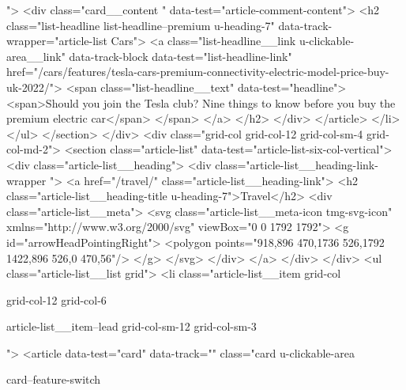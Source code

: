 {{{			
			
			 ">
<div class="card__content " data-test="article-comment-content">
<h2 class="list-headline list-headline--premium u-heading-7" data-track-wrapper="article-list Cars">
<a class="list-headline__link u-clickable-area__link" data-track-block data-test="list-headline-link" href="/cars/features/tesla-cars-premium-connectivity-electric-model-price-buy-uk-2022/">
<span class="list-headline__text" data-test="headline">
<span>Should you join the Tesla club? Nine things to know before you buy the premium electric car</span>
</span>
</a>
</h2>
</div>
</article>
</li>
</ul>
</section>
</div>
<div class="grid-col grid-col-12 grid-col-sm-4 grid-col-md-2">
<section class="article-list" data-test="article-list-six-col-vertical">
<div class="article-list__heading">
<div class="article-list__heading-link-wrapper
				">
<a href="/travel/" class="article-list__heading-link">
<h2 class="article-list__heading-title u-heading-7">Travel</h2>
<div class="article-list__meta">
<svg class="article-list__meta-icon  tmg-svg-icon" xmlns="http://www.w3.org/2000/svg" viewBox="0 0 1792 1792">
<g id="arrowHeadPointingRight">
<polygon points="918,896 470,1736 526,1792 1422,896 526,0 470,56"/>
</g>
</svg>
</div>
</a>
</div>
</div>
<ul class="article-list__list grid">
<li class="article-list__item
				grid-col
				
				
				
				grid-col-12
				grid-col-6
				
				
				
				
				article-list__item--lead grid-col-sm-12
				grid-col-sm-3
				
				
				">
<article data-test="card" data-track="" class="card
			u-clickable-area
			
			card--feature-switch
			
			
			
			
			
}}}

